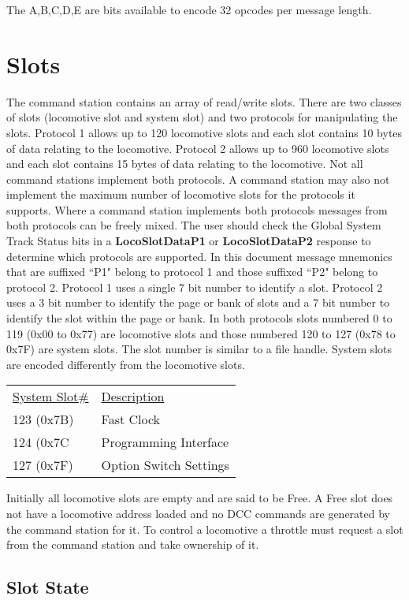 The A,B,C,D,E are bits available to encode 32 opcodes per message length.

\section{Slots}

The command station contains an array of read/write slots. There are two classes of slots (\gls{locomotive slot} and \gls{system slot}) and two protocols for manipulating the slots. Protocol 1 allows up to 120 locomotive slots and each slot contains 10 bytes of data relating to the locomotive. Protocol 2 allows up to 960 locomotive slots and each slot contains 15 bytes of data relating to the locomotive. Not all command stations implement both protocols. A command station may also not implement the maximum number of locomotive slots for the protocols it supports. Where a command station implements both protocols messages from both protocols can be freely mixed. The user should check the \gls{Global System Track Status} bits in a \textbf{LocoSlotDataP1} or \textbf{LocoSlotDataP2} response to determine which protocols are supported. In this document message mnemonics that are suffixed ``P1" belong to protocol 1 and those suffixed ``P2" belong to protocol 2. Protocol 1 uses a single 7 bit number to identify a slot. Protocol 2 uses a 3 bit number to identify the page or bank of slots and a 7 bit number to identify the slot within the page or bank. In both protocols slots numbered 0 to 119 (0x00 to 0x77) are locomotive slots and those numbered 120 to 127 (0x78 to 0x7F) are system slots. The slot number is similar to a file handle. System slots are encoded differently from the locomotive slots. 

\begin{tabular}{l l}
\underline{System Slot\#} & \underline{Description}\\
123 (0x7B) & Fast Clock\\
124 (0x7C & Programming Interface\\
127 (0x7F) & Option Switch Settings\\
\end{tabular}

Initially all locomotive slots are empty and are said to be Free. A Free slot does not have a locomotive address loaded and no DCC commands are generated by the command station for it. To control a locomotive a \gls{throttle} must request a slot from the command station and take ownership of it.

\subsection{Slot State}

